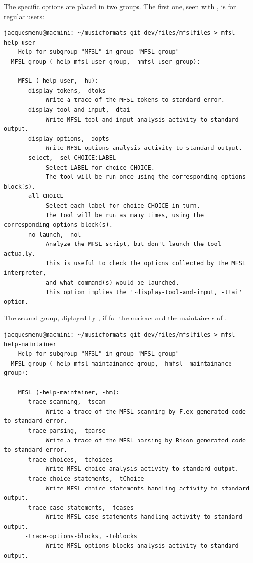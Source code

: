 The specific options are placed in two groups. The first one, seen with , is for regular users:
\begin{lstlisting}[language=Terminal]
jacquesmenu@macmini: ~/musicformats-git-dev/files/mfslfiles > mfsl -help-user
--- Help for subgroup "MFSL" in group "MFSL group" ---
  MFSL group (-help-mfsl-user-group, -hmfsl-user-group):
  --------------------------
    MFSL (-help-user, -hu):
      -display-tokens, -dtoks
            Write a trace of the MFSL tokens to standard error.
      -display-tool-and-input, -dtai
            Write MFSL tool and input analysis activity to standard output.
      -display-options, -dopts
            Write MFSL options analysis activity to standard output.
      -select, -sel CHOICE:LABEL
            Select LABEL for choice CHOICE.
            The tool will be run once using the corresponding options block(s).
      -all CHOICE
            Select each label for choice CHOICE in turn.
            The tool will be run as many times, using the corresponding options block(s).
      -no-launch, -nol
            Analyze the MFSL script, but don't launch the tool actually.
            This is useful to check the options collected by the MFSL interpreter,
            and what command(s) would be launched.
            This option implies the '-display-tool-and-input, -ttai' option.
\end{lstlisting}

The second group, diplayed by , if for the curious and the maintainers of \mf:
\begin{lstlisting}[language=Terminal]
jacquesmenu@macmini: ~/musicformats-git-dev/files/mfslfiles > mfsl -help-maintainer
--- Help for subgroup "MFSL" in group "MFSL group" ---
  MFSL group (-help-mfsl-maintainance-group, -hmfsl--maintainance-group):
  --------------------------
    MFSL (-help-maintainer, -hm):
      -trace-scanning, -tscan
            Write a trace of the MFSL scanning by Flex-generated code to standard error.
      -trace-parsing, -tparse
            Write a trace of the MFSL parsing by Bison-generated code to standard error.
      -trace-choices, -tchoices
            Write MFSL choice analysis activity to standard output.
      -trace-choice-statements, -tChoice
            Write MFSL choice statements handling activity to standard output.
      -trace-case-statements, -tcases
            Write MFSL case statements handling activity to standard output.
      -trace-options-blocks, -toblocks
            Write MFSL options blocks analysis activity to standard output.
\end{lstlisting}



